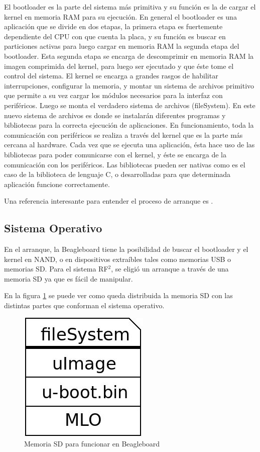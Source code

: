 El bootloader es la parte del sistema más primitiva y su función es la de cargar el
kernel en memoria RAM para su ejecución. En general el bootloader
es una aplicación que se divide en dos etapas, la primera etapa es fuertemente dependiente
del CPU con que cuenta la placa, y su función es buscar en particiones activas para luego cargar 
en memoria RAM la segunda etapa del bootloader. Esta segunda etapa se encarga de descomprimir
en memoria RAM la imagen comprimida del kernel, para luego ser ejecutado y que éste tome el
control del sistema.
El kernel se encarga a grandes rasgos de habilitar interrupciones, configurar la memoria, y montar un sistema de archivos primitivo que permite a su vez cargar los módulos necesarios para la interfaz con periféricos. Luego se monta el verdadero sistema de archivos (fileSystem). En este nuevo sistema de archivos es donde se instalarán diferentes programas y bibliotecas para la correcta ejecución de aplicaciones.
En funcionamiento, toda la comunicación con periféricos se realiza a través del kernel que es la parte más cercana al hardware.
Cada vez que se ejecuta una aplicación, ésta hace uso de las bibliotecas para poder comunicarse con el kernel, y éste se encarga de la comunicación con los periféricos. Las bibliotecas pueden ser nativas como es el caso de la biblioteca de lenguaje C, o desarrolladas para que determinada aplicación funcione correctamente. 

Una referencia interesante para entender el proceso de arranque es \cite{linuxBoot}.


\subsection{Sistema Operativo}
En el arranque, la Beagleboard tiene la posibilidad de buscar el bootloader y el kernel en NAND, o en dispositivos extraíbles tales como memorias USB o memorias SD. Para el sistema RF$^{2}$, se eligió un arranque a través de una memoria SD ya que es fácil de manipular.

En la figura \ref{Fig:SD} se puede ver como queda distribuida la memoria SD con las distintas partes
que conforman el sistema operativo. 

\begin{figure}[H]
\centering
  \begin{center}
  \includegraphics[scale=.4]{Imagenes/sd.jpg} 
  \end{center}
  \caption{Memoria SD para funcionar en Beagleboard}\label{Fig:SD} 
\end{figure}

